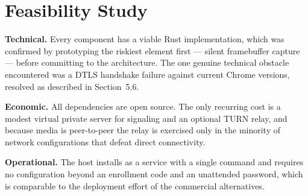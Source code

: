 \section{Feasibility Study}

\textbf{Technical.} Every component has a viable Rust implementation, which was
confirmed by prototyping the riskiest element first --- silent framebuffer
capture --- before committing to the architecture. The one genuine technical
obstacle encountered was a DTLS handshake failure against current Chrome
versions, resolved as described in Section~5.6.

\textbf{Economic.} All dependencies are open source. The only recurring cost is
a modest virtual private server for signaling and an optional TURN relay, and
because media is peer-to-peer the relay is exercised only in the minority of
network configurations that defeat direct connectivity.

\textbf{Operational.} The host installs as a service with a single command and
requires no configuration beyond an enrollment code and an unattended password,
which is comparable to the deployment effort of the commercial alternatives.
